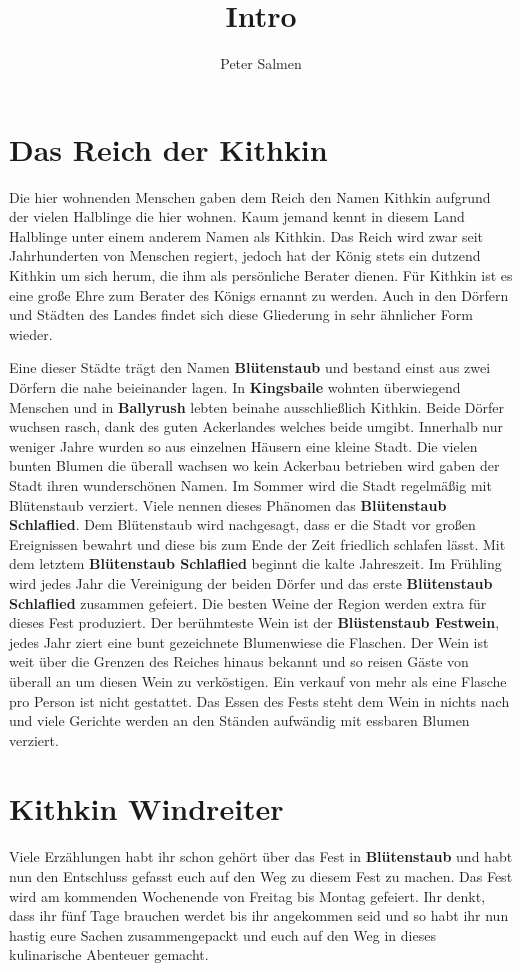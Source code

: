 \documentclass[10pt,a4paper,onecolumn]{article}
\author{Peter Salmen}
\title{Intro}
\begin{document}
\section*{Das Reich der Kithkin}
Die hier wohnenden Menschen gaben dem Reich den Namen Kithkin 
aufgrund der vielen Halblinge die hier wohnen. Kaum jemand kennt 
in diesem Land Halblinge unter einem anderem Namen als Kithkin.
Das Reich wird zwar seit Jahrhunderten von Menschen regiert,
jedoch hat der König stets ein dutzend Kithkin um sich herum, 
die ihm als persönliche Berater dienen. Für Kithkin ist es eine
große Ehre zum Berater des Königs ernannt zu werden.
Auch in den Dörfern und Städten des Landes findet sich diese Gliederung
in sehr ähnlicher Form wieder.

Eine dieser Städte trägt den Namen \textbf{Blütenstaub} und bestand
einst aus zwei Dörfern die nahe beieinander lagen. In \textbf{Kingsbaile}
wohnten überwiegend Menschen und in \textbf{Ballyrush} lebten beinahe
ausschließlich Kithkin. Beide Dörfer wuchsen rasch, dank des guten
Ackerlandes welches beide umgibt. Innerhalb nur weniger Jahre wurden 
so aus einzelnen Häusern eine kleine Stadt. Die vielen bunten Blumen 
die überall wachsen wo kein Ackerbau betrieben wird gaben der Stadt 
ihren wunderschönen Namen. Im Sommer wird die Stadt regelmäßig  mit 
Blütenstaub verziert. Viele nennen dieses Phänomen das 
\textbf{Blütenstaub Schlaflied}. Dem Blütenstaub wird nachgesagt, dass
er die Stadt vor großen Ereignissen bewahrt und diese bis zum Ende der
Zeit friedlich schlafen lässt. Mit dem letztem 
\textbf{Blütenstaub Schlaflied} beginnt die kalte Jahreszeit. Im 
Frühling wird jedes Jahr die Vereinigung der beiden Dörfer und das 
erste \textbf{Blütenstaub Schlaflied} zusammen gefeiert. Die besten Weine
der Region werden extra für dieses Fest produziert. Der berühmteste Wein 
ist der \textbf{Blüstenstaub Festwein}, jedes Jahr ziert eine bunt 
gezeichnete Blumenwiese die Flaschen. Der Wein ist weit über die Grenzen 
des Reiches hinaus bekannt und so reisen Gäste von überall an um diesen 
Wein zu verköstigen. Ein verkauf von mehr als eine Flasche pro Person ist
nicht gestattet. Das Essen des Fests steht dem Wein in nichts nach und 
viele Gerichte werden an den Ständen aufwändig mit essbaren Blumen verziert.
\section*{Kithkin Windreiter}
Viele Erzählungen habt ihr schon gehört über das Fest in 
\textbf{Blütenstaub} und habt nun den Entschluss gefasst euch auf den Weg
zu diesem Fest zu machen. Das Fest wird am kommenden Wochenende von Freitag
bis Montag gefeiert. Ihr denkt, dass ihr fünf Tage brauchen werdet bis ihr
angekommen seid  und so habt ihr nun hastig eure Sachen zusammengepackt 
und euch auf den Weg in dieses kulinarische Abenteuer gemacht.
\newpage
\end{document}
